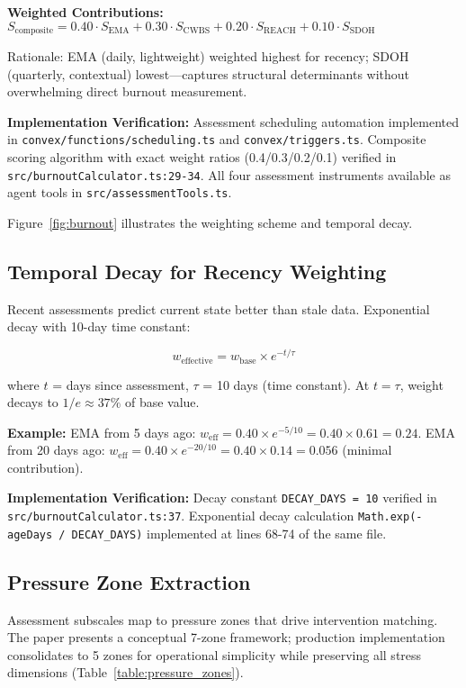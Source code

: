 \documentclass{article}
\begin{document}
\textbf{Weighted Contributions:} $S_{\text{composite}} = 0.40 \cdot S_{\text{EMA}} + 0.30 \cdot S_{\text{CWBS}} + 0.20 \cdot S_{\text{REACH}} + 0.10 \cdot S_{\text{SDOH}}$

Rationale: EMA (daily, lightweight) weighted highest for recency; SDOH (quarterly, contextual) lowest—captures structural determinants without overwhelming direct burnout measurement.

\textbf{Implementation Verification:} Assessment scheduling automation implemented in \texttt{convex/functions/scheduling.ts} and \texttt{convex/triggers.ts}. Composite scoring algorithm with exact weight ratios (0.4/0.3/0.2/0.1) verified in \texttt{src/burnoutCalculator.ts:29-34}. All four assessment instruments available as agent tools in \texttt{src/assessmentTools.ts}.

Figure~\ref{fig:burnout} illustrates the weighting scheme and temporal decay.

%
\subsection{Temporal Decay for Recency Weighting}%
\label{subsec:TemporalDecayforRecencyWeighting}%
Recent assessments predict current state better than stale data. Exponential decay with 10-day time constant:

$$w_{\text{effective}} = w_{\text{base}} \times e^{-t / \tau}$$

where $t$ = days since assessment, $\tau$ = 10 days (time constant). At $t = \tau$, weight decays to $1/e \approx 37\%$ of base value.

\textbf{Example:} EMA from 5 days ago: $w_{\text{eff}} = 0.40 \times e^{-5/10} = 0.40 \times 0.61 = 0.24$. EMA from 20 days ago: $w_{\text{eff}} = 0.40 \times e^{-20/10} = 0.40 \times 0.14 = 0.056$ (minimal contribution).

\textbf{Implementation Verification:} Decay constant \texttt{DECAY\_DAYS = 10} verified in \texttt{src/burnoutCalculator.ts:37}. Exponential decay calculation \texttt{Math.exp(-ageDays / DECAY\_DAYS)} implemented at lines 68-74 of the same file.

%
\subsection{Pressure Zone Extraction}%
\label{subsec:PressureZoneExtraction}%
Assessment subscales map to pressure zones that drive intervention matching. The paper presents a conceptual 7-zone framework; production implementation consolidates to 5 zones for operational simplicity while preserving all stress dimensions (Table~\ref{table:pressure_zones}).
\end{document}

